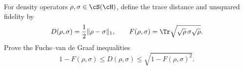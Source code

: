 For density operators $\rho,\sigma\in\cS(\cH)$, define the trace distance and unsquared fidelity by
$$
D(\rho,\sigma)=\frac{1}{2}\|\rho-\sigma\|_1,
\qquad
F(\rho,\sigma)=\Tr\sqrt{\sqrt{\rho}\,\sigma\sqrt{\rho}}.
$$
Prove the Fuchs--van de Graaf inequalities
$$
1-F(\rho,\sigma)
\leq
D(\rho,\sigma)
\leq
\sqrt{1-F(\rho,\sigma)^2}.
$$
